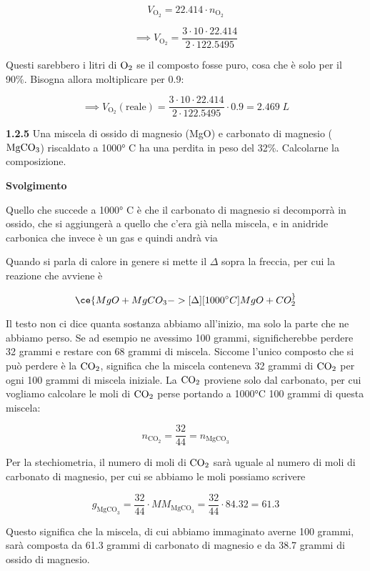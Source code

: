 $$V_{\text{O}_2}=22.414 \cdot n_{\text{O}_2}$$

$$\implies V_{\text{O}_2}=\frac{3 \cdot 10 \cdot 22.414}{2 \cdot 122.5495}$$

Questi sarebbero i litri di $\rm O_2$ se il composto fosse puro, cosa che è solo per il 90\%. Bisogna allora moltiplicare per 0.9:

$$\implies V_{\text{O}_2}(\text{reale})
=\frac{3 \cdot 10 \cdot 22.414}{2 \cdot 122.5495}\cdot 0.9=2.469\;L$$

\textbf{1.2.5} Una miscela di ossido di magnesio (MgO) e carbonato di magnesio ($\rm MgCO_3$) riscaldato a 1000° C ha una perdita in peso del 32\%. Calcolarne la composizione.

\vspace{0.2cm}\large\textbf{Svolgimento}\normalsize

\vspace{0.2cm}Quello che succede a 1000° C è che il carbonato di magnesio si decomporrà in ossido, che si aggiungerà a quello che c'era già nella miscela, e in anidride carbonica che invece è un gas e quindi andrà via

Quando si parla di calore in genere si mette il $\Delta$ sopra la freccia, per cui la reazione che avviene è

$$\ce{MgO + MgCO_3 ->[{\Delta}][{1000^{\circ}C}] MgO + CO_2 ^}$$

Il testo non ci dice quanta sostanza abbiamo all'inizio, ma solo la parte che ne abbiamo perso. Se ad esempio ne avessimo 100 grammi, significherebbe perdere 32 grammi e restare con 68 grammi di miscela. Siccome l'unico composto che si può perdere è la $\rm CO_2$, significa che la miscela conteneva 32 grammi di $\rm CO_2$ per ogni 100 grammi di miscela iniziale. La $\rm CO_2$ proviene solo dal carbonato, per cui vogliamo calcolare le moli di $\rm CO_2$ perse portando a 1000°C 100 grammi di questa miscela:

$$n_{\text{CO}_2}=\frac{32}{44}=n_{\text{MgCO}_3}$$

Per la stechiometria, il numero di moli di $\rm CO_2$ sarà uguale al numero di moli di carbonato di magnesio, per cui se abbiamo le moli possiamo scrivere

$$g_{\text{MgCO}_3}=\frac{32}{44} \cdot MM_{\text{MgCO}_3}
=\frac{32}{44} \cdot 84.32=61.3$$

Questo significa che la miscela, di cui abbiamo immaginato averne 100 grammi, sarà composta da 61.3 grammi di carbonato di magnesio e da 38.7 grammi di ossido di magnesio.

